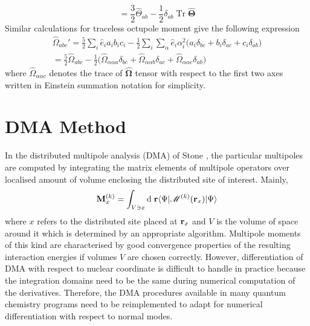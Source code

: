 \documentclass[a4paper,titlepage,twoside,fleqn,12pt]{book}
\newcommand{\BM}[1]{\bm{#1}}
\begin{document}
\begin{appendices}
\begin{refsection}
\begin{equation}
= \frac{3}{2}\hat{\Theta}_{ab} - \frac{1}{2}\delta_{ab}\;\mathrm{Tr}\;\hat{\BM \Theta}  
\end{equation}
%
Similar calculations for traceless octupole moment give the
following expression
%
\begin{multline}
\hat{\Omega}_{abc}' = \frac{5}{2}\sum_i \hat{e}_ia_ib_ic_i - \frac{1}{2}\sum_i\sum_{\alpha}\hat{e}_i\alpha_i^2 \big(
                                        a_i\delta_{bc} + b_i\delta_{ac} + c_i\delta_{ab}  \big) \\ 
= \frac{5}{2}\hat{\Omega}_{abc} - \frac{1}{2} \big( \hat{\Omega}_{\alpha\alpha a}\delta_{bc} +
                                                \hat{\Omega}_{\alpha\alpha b}\delta_{ac} + 
                                                \hat{\Omega}_{\alpha\alpha c}\delta_{ab}  \big) 
\end{multline}
%
where $\hat{\Omega}_{\alpha\alpha c}$ denotes the trace of $\hat{\BM\Omega}$ 
tensor with respect to the first two axes written in Einstein
summation notation for simplicity. 

\section{DMA Method}

In the distributed multipole analysis 
(DMA) of Stone \citep{Stone.JCTC.2005}, the particular multipoles
are computed by integrating the matrix elements of multipole
operators over localised amount of volume enclosing the distributed
site of interest. Mainly,
%
\begin{equation}
{\bf M}^{(k)}_x  = \int_{V\ni x} {\rm d}\;{\bf r}
   \langle \Psi  \lvert \mathscr{M}^{(k)} ({\bf r}_x) \rvert  \Psi \rangle
\end{equation}
%
where $x$ refers to the distributed site placed at ${\bf r}_x$
and $V$ is the volume of space around it which is
determined by an appropriate algorithm. 
Multipole moments of this kind are characterised by good convergence
properties of the resulting interaction energies
if volumes $V$ are chosen correctly. 
However, differentiation of DMA with respect to nuclear coordinate
is difficult to handle in practice because the integration domains need to be the same
during numerical computation of the derivatives. Therefore, the DMA
procedures available in many quantum chemistry programs 
need to be reimplemented to adapt for numerical differentiation with respect
to normal modes.


\end{refsection}
\end{appendices}
\end{document}
